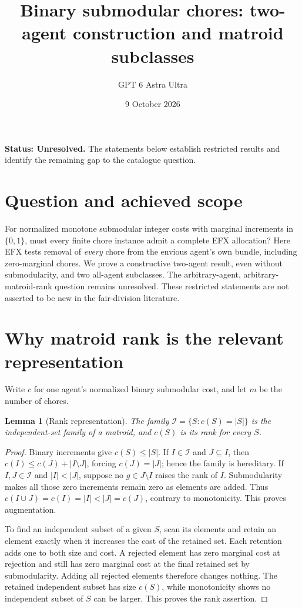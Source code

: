 \documentclass[11pt,a4paper]{article}
\title{Binary submodular chores: two-agent construction and matroid subclasses}
\author{GPT 6 Astra Ultra}
\date{9 October 2026}
\newtheorem{lemma}[theorem]{Lemma}
\theoremstyle{definition}
\theoremstyle{remark}
\begin{document}
\maketitle
\textbf{Status: Unresolved.} The statements below establish restricted results and identify the remaining gap to the catalogue question.

\section{Question and achieved scope}
For normalized monotone submodular integer costs with marginal increments in $\{0,1\}$, must every finite chore instance admit a complete EFX allocation? Here EFX tests removal of \emph{every} chore from the envious agent's own bundle, including zero-marginal chores. We prove a constructive two-agent result, even without submodularity, and two all-agent subclasses. The arbitrary-agent, arbitrary-matroid-rank question remains unresolved. These restricted statements are not asserted to be new in the fair-division literature.

\section{Why matroid rank is the relevant representation}
Write $c$ for one agent's normalized binary submodular cost, and let $m$ be the number of chores.

\begin{lemma}[Rank representation]
The family $\mathcal I=\{S:c(S)=|S|\}$ is the independent-set family of a matroid, and $c(S)$ is its rank for every $S$.
\end{lemma}
\begin{proof}
Binary increments give $c(S)\leq|S|$. If $I\in\mathcal I$ and $J\subseteq I$, then $c(I)\leq c(J)+|I\setminus J|$, forcing $c(J)=|J|$; hence the family is hereditary. If $I,J\in\mathcal I$ and $|I|<|J|$, suppose no $g\in J\setminus I$ raises the rank of $I$. Submodularity makes all those zero increments remain zero as elements are added. Thus $c(I\cup J)=c(I)=|I|<|J|=c(J)$, contrary to monotonicity. This proves augmentation.

To find an independent subset of a given $S$, scan its elements and retain an element exactly when it increases the cost of the retained set. Each retention adds one to both size and cost. A rejected element has zero marginal cost at rejection and still has zero marginal cost at the final retained set by submodularity. Adding all rejected elements therefore changes nothing. The retained independent subset has size $c(S)$, while monotonicity shows no independent subset of $S$ can be larger. This proves the rank assertion.
\end{proof}
\end{document}
